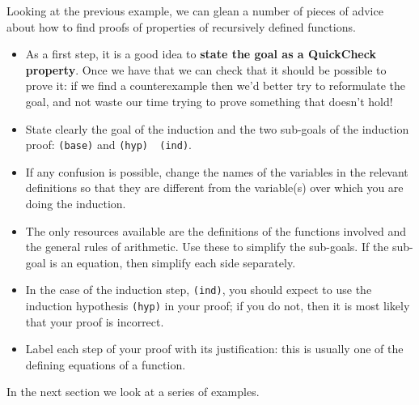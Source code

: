 Looking at the previous example, we can glean a number of pieces of
advice about how to find proofs of properties of recursively defined
functions.
\begin{itemize}
\item As a first step, it is a good idea to \textbf{state the goal as a QuickCheck property}. Once we have that we can check that it should be possible to prove it: if we find a counterexample then we'd better try to reformulate the goal, and not waste our time trying to prove something that doesn't hold!
\item State clearly the goal of the induction and the two sub-goals of the
induction proof: \texttt{(base)} and \texttt{(hyp) \imp\ (ind)}.
\item If any confusion is possible, change the names of the variables
in the relevant definitions so that they are different from the
variable(s) over which you are doing the induction.
\item The only resources available are the definitions of the functions
involved and the general rules of arithmetic. 
Use these to simplify the sub-goals. If the sub-goal is an
equation, then simplify each side separately.
\item In the case of the induction step, \texttt{(ind)}, you should expect to use the
induction hypothesis \texttt{(hyp)} in your proof; if you do not, then it is most
likely that your proof is incorrect.
\item Label each step of your proof with its justification: this is
usually one of the defining equations of a function.
\end{itemize}
In the next section we look at a series of examples.

